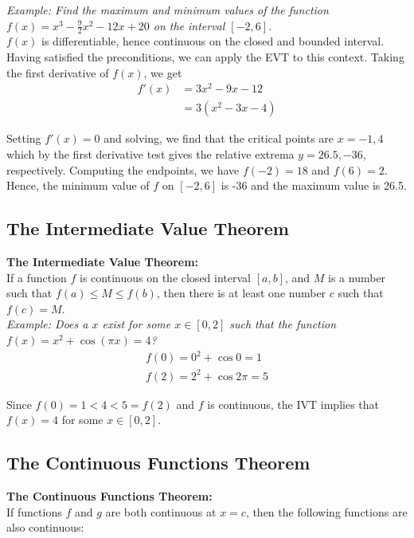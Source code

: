         \noindent \color{blue} \textit{Example: Find the maximum and minimum values of the
        function $f(x)=x^3-\frac{9}{2}x^2-12x+20$ on the interval $[-2,6]$}. \color{black} \\
        $f(x)$ is differentiable, hence continuous on the closed and bounded interval. Having
        satisfied the preconditions, we can apply the EVT to this context. Taking the first
        derivative of $f(x)$, we get \\

        \begin{align*}
            f'(x) &= 3x^2 -9x -12 \\
            &= 3(x^2-3x-4)
        \end{align*}

        \noindent Setting $f'(x)=0$ and solving, we find that the critical points are $x=-1,4$
        which by the first derivative test gives the relative extrema $y=26.5,-36$, respectively.
        Computing the endpoints, we have $f(-2)=18$ and $f(6)=2$. Hence, the minimum value of $f$
        on $[-2,6]$ is -36 and the maximum value is 26.5.



    \subsection{The Intermediate Value Theorem}
        \color{purple} \textbf{The Intermediate Value Theorem:} \color{black} \\
        If a function $f$ is continuous on the closed interval $[a,b]$, and $M$ is a number such
        that $f(a)\leq M\leq f(b)$, then there is at least one number $c$ such that $f(c)=M$. \\

        \noindent \color{blue} \textit{Example: Does a $x$ exist for some $x\in[0,2]$ such that
        the function $f(x)=x^2+\cos{(\pi x)}=4$?} \color{black} \\

        \begin{align*}
            f(0) = 0^2 + \cos{0} = 1 \\
            f(2) = 2^2 + \cos{2\pi} = 5
        \end{align*}

        \noindent Since $f(0)=1<4<5=f(2)$ and $f$ is continuous, the IVT implies that $f(x)=4$
        for some $x\in[0,2]$.



    \subsection{The Continuous Functions Theorem}
        \color{purple} \textbf{The Continuous Functions Theorem:} \color{black} \\
        If functions $f$ and $g$ are both continuous at $x=c$, then the following functions are
        also continuous: \\

